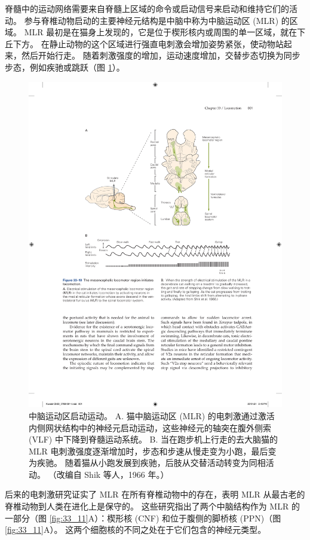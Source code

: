 脊髓中的运动网络需要来自脊髓上区域的命令或启动信号来启动和维持它们的活动。
参与脊椎动物启动的主要神经元结构是中脑中称为中脑运动区 (MLR) 的区域。
MLR 最初是在猫身上发现的，它是位于楔形核内或周围的单一区域，就在下丘下方。
在静止动物的这个区域进行强直电刺激会增加姿势紧张，使动物站起来，然后开始行走。
随着刺激强度的增加，运动速度增加，交替步态切换为同步步态，例如疾驰或跳跃（图 \ref{fig:33_10}）。


\begin{figure}[htbp]
	\centering
	\includegraphics[width=0.7\linewidth]{chap33/fig_33_10}
	\caption{中脑运动区启动运动。 A. 猫中脑运动区 (MLR) 的电刺激通过激活内侧网状结构中的神经元启动运动，这些神经元的轴突在腹外侧索 (VLF) 中下降到脊髓运动系统。 B. 当在跑步机上行走的去大脑猫的 MLR 电刺激强度逐渐增加时，步态和步速从慢走变为小跑，最后变为疾驰。 随着猫从小跑发展到疾驰，后肢从交替活动转变为同相活动。 （改编自 Shik 等人，1966 年。）}
	\label{fig:33_10}
\end{figure}

后来的电刺激研究证实了 MLR 在所有脊椎动物中的存在，表明 MLR 从最古老的脊椎动物到人类在进化上是保守的。
这些研究指出了两个中脑结构作为 MLR 的一部分（图 \ref{fig:33_11}A）：楔形核 (CNF) 和位于腹侧的脚桥核 (PPN)（图 \ref{fig:33_11}A）。
这两个细胞核的不同之处在于它们包含的神经元类型。


